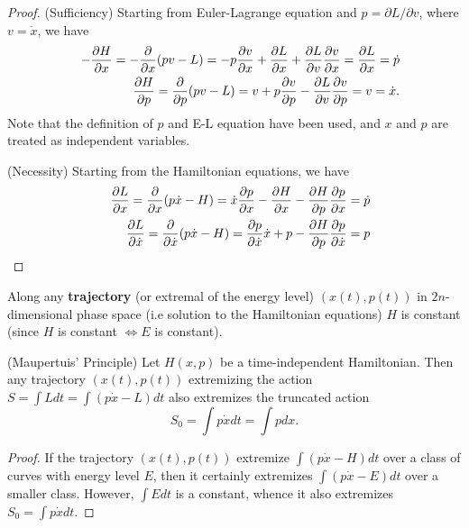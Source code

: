 \begin{proof}
	(Sufficiency) Starting from Euler-Lagrange equation and $p = \partial L/ \partial v$, where $v = \dot{x}$, we have
	\begin{eqnarray}
		&&-\frac{ \partial H}{ \partial x } = -\frac{ \partial  }{ \partial x } (pv - L) = - p \frac{ \partial v}{ \partial x } + \frac{ \partial L}{ \partial x } + \frac{ \partial L}{ \partial v }\frac{ \partial v}{ \partial x } = \frac{ \partial L}{ \partial x } = \dot{p}
		\nonumber\\
		&&\frac{ \partial H}{ \partial p } = \frac{ \partial  }{ \partial p } (pv - L) = v + p \frac{ \partial v}{ \partial p } - \frac{ \partial L}{ \partial v } \frac{ \partial v}{ \partial p } = v = \dot{x}.
		\nonumber
	\end{eqnarray}
	Note that the definition of $p$ and E-L equation have been used, and $x$ and $p$ are treated as independent variables.
	
	(Necessity) Starting from the Hamiltonian equations, we have
	\begin{eqnarray}
		&&\frac{ \partial L}{ \partial x } = \frac{ \partial  }{ \partial x }(p\dot{x} - H) = \dot{x} \frac{ \partial p}{ \partial x } - \frac{ \partial H}{ \partial x } - \frac{ \partial H}{ \partial p } \frac{ \partial p}{ \partial x } = \dot{p}
		\nonumber\\
		&&\frac{ \partial L}{ \partial \dot{x} } = \frac{ \partial  }{ \partial \dot{x} }(p\dot{x} - H) = \frac{ \partial p}{ \partial \dot{x} } \dot{x} + p - \frac{ \partial H}{ \partial p } \frac{ \partial p}{ \partial \dot{x} } = p
		\nonumber
	\end{eqnarray}
\end{proof}

\begin{corollary}
	Along any \textbf{trajectory} (or extremal of the energy level) $(x(t), p(t))$ in $2n$-dimensional phase space (i.e solution to the Hamiltonian equations) $H$ is constant (since $H$ is constant $\iff E$ is constant).
\end{corollary}

\begin{theorem}
	(Maupertuis' Principle) Let $H(x, p)$ be a time-independent Hamiltonian. Then any trajectory $(x(t), p(t))$ extremizing the action $S = \int L dt = \int (p\dot{x} - L) dt$ also extremizes the truncated action
	\[ S_0 = \int p\dot{x} dt = \int p dx. \]
\end{theorem}
\begin{proof}
	If the trajectory $(x(t), p(t))$ extremize $\int (p\dot{x} - H) dt$ over a class of curves with energy level $E$, then it certainly extremizes $\int (p\dot{x} - E) dt$ over a smaller class. However, $\int E dt$ is a constant, whence it also extremizes $S_0 = \int p\dot{x} dt$.
\end{proof}



